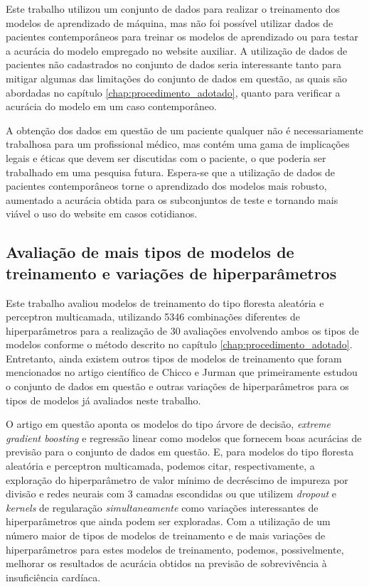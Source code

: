 Este trabalho utilizou um conjunto de dados \cite{larxel_dataset} para realizar o treinamento dos modelos de aprendizado de máquina, mas não foi possível utilizar dados de pacientes contemporâneos para treinar os modelos de aprendizado ou para testar a acurácia do modelo empregado no website auxiliar. A utilização de dados de pacientes não cadastrados no conjunto de dados seria interessante tanto para mitigar algumas das limitações do conjunto de dados em questão, as quais são abordadas no capítulo \ref{chap:procedimento_adotado}, quanto para verificar a acurácia do modelo em um caso contemporâneo.

A obtenção dos dados em questão de um paciente qualquer não é necessariamente trabalhosa para um profissional médico, mas contém uma gama de implicações legais e éticas que devem ser discutidas com o paciente, o que poderia ser trabalhado em uma pesquisa futura. Espera-se que a utilização de dados de pacientes contemporâneos torne o aprendizado dos modelos mais robusto, aumentado a acurácia obtida para os subconjuntos de teste e tornando mais viável o uso do website em casos cotidianos.

\subsection{Avaliação de mais tipos de modelos de treinamento e variações de hiperparâmetros}

Este trabalho avaliou modelos de treinamento do tipo floresta aleatória e perceptron multicamada, utilizando 5346 combinações diferentes de hiperparâmetros para a realização de 30 avaliações envolvendo ambos os tipos de modelos conforme o método descrito no capítulo \ref{chap:procedimento_adotado}. Entretanto, ainda existem outros tipos de modelos de treinamento que foram mencionados no artigo científico de Chicco e Jurman \cite{chicco2020} que primeiramente estudou o conjunto de dados em questão e outras variações de hiperparâmetros para os tipos de modelos já avaliados neste trabalho.

O artigo em questão aponta os modelos do tipo árvore de decisão, \textit{extreme gradient boosting} e regressão linear como modelos que fornecem boas acurácias de previsão para o conjunto de dados em questão. E, para modelos do tipo floresta aleatória e perceptron multicamada, podemos citar, respectivamente, a exploração do hiperparâmetro de valor mínimo de decréscimo de impureza por divisão e redes neurais com 3 camadas escondidas ou que utilizem \textit{dropout} e \textit{kernels} de regularação \textit{simultaneamente} como variações interessantes de hiperparâmetros que ainda podem ser exploradas. Com a utilização de um número maior de tipos de modelos de treinamento e de mais variações de hiperparâmetros para estes modelos de treinamento, podemos, possivelmente, melhorar os resultados de acurácia obtidos na previsão de sobrevivência à insuficiência cardíaca.

